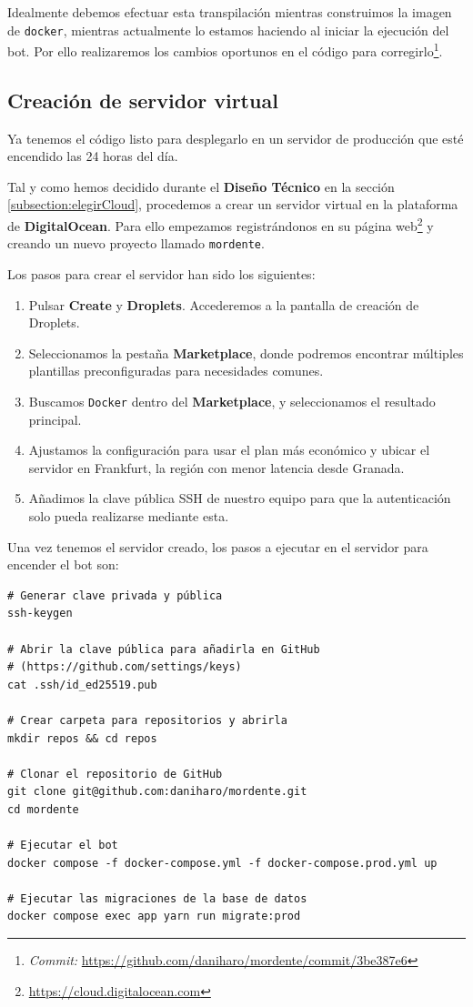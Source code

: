 Idealmente debemos efectuar esta transpilación mientras construimos la imagen de \texttt{docker}, mientras actualmente lo estamos haciendo al iniciar la ejecución del bot. Por ello realizaremos los cambios oportunos en el código para corregirlo\footnote{\textit{Commit:} \url{https://github.com/daniharo/mordente/commit/3be387e6}}.


\subsection{Creación de servidor virtual}

Ya tenemos el código listo para desplegarlo en un servidor de producción que esté encendido las 24 horas del día.

Tal y como hemos decidido durante el \textbf{Diseño Técnico} en la sección \ref{subsection:elegirCloud}, procedemos a crear un servidor virtual en la plataforma de \textbf{DigitalOcean}. Para ello empezamos registrándonos en su página web\footnote{\url{https://cloud.digitalocean.com}} y creando un nuevo proyecto llamado \texttt{mordente}.

Los pasos para crear el servidor han sido los siguientes:

\begin{enumerate}
    \item Pulsar \textbf{Create} y \textbf{Droplets}. Accederemos a la pantalla de creación de Droplets.
    \item Seleccionamos la pestaña \textbf{Marketplace}, donde podremos encontrar múltiples plantillas preconfiguradas para necesidades comunes.
    \item Buscamos \texttt{Docker} dentro del \textbf{Marketplace}, y seleccionamos el resultado principal.
    \item Ajustamos la configuración para usar el plan más económico y ubicar el servidor en Frankfurt, la región con menor latencia desde Granada.
    \item Añadimos la clave pública SSH de nuestro equipo para que la autenticación solo pueda realizarse mediante esta.
\end{enumerate}

Una vez tenemos el servidor creado, los pasos a ejecutar en el servidor para encender el bot son:

\begin{verbatim}
# Generar clave privada y pública
ssh-keygen

# Abrir la clave pública para añadirla en GitHub
# (https://github.com/settings/keys)
cat .ssh/id_ed25519.pub

# Crear carpeta para repositorios y abrirla
mkdir repos && cd repos

# Clonar el repositorio de GitHub
git clone git@github.com:daniharo/mordente.git
cd mordente

# Ejecutar el bot
docker compose -f docker-compose.yml -f docker-compose.prod.yml up

# Ejecutar las migraciones de la base de datos
docker compose exec app yarn run migrate:prod
\end{verbatim}

